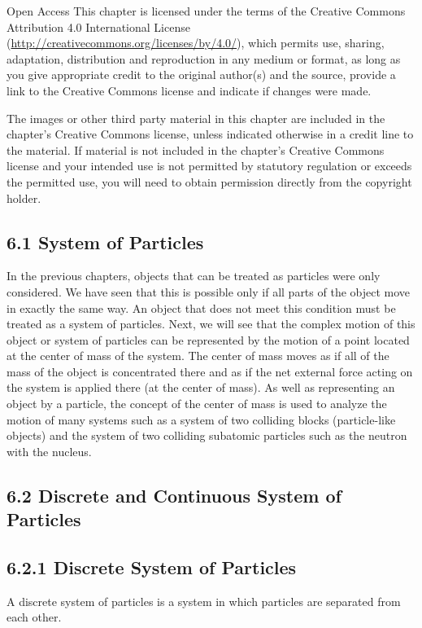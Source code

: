 \documentclass[10pt]{article}
\begin{document}
Open Access This chapter is licensed under the terms of the Creative Commons Attribution 4.0 International License (\href{http://creativecommons.org/licenses/by/4.0/}{http://creativecommons.org/licenses/by/4.0/}), which permits use, sharing, adaptation, distribution and reproduction in any medium or format, as long as you give appropriate credit to the original author(s) and the source, provide a link to the Creative Commons license and indicate if changes were made.

The images or other third party material in this chapter are included in the chapter's Creative Commons license, unless indicated otherwise in a credit line to the material. If material is not included in the chapter's Creative Commons license and your intended use is not permitted by statutory regulation or exceeds the permitted use, you will need to obtain permission directly from the copyright holder.

\subsection*{6.1 System of Particles}
In the previous chapters, objects that can be treated as particles were only considered. We have seen that this is possible only if all parts of the object move in exactly the same way. An object that does not meet this condition must be treated as a system of particles. Next, we will see that the complex motion of this object or system of particles can be represented by the motion of a point located at the center of mass of the system. The center of mass moves as if all of the mass of the object is concentrated there and as if the net external force acting on the system is applied there (at the center of mass). As well as representing an object by a particle, the concept of the center of mass is used to analyze the motion of many systems such as a system of two colliding blocks (particle-like objects) and the system of two colliding subatomic particles such as the neutron with the nucleus.

\subsection*{6.2 Discrete and Continuous System of Particles}
\subsection*{6.2.1 Discrete System of Particles}
A discrete system of particles is a system in which particles are separated from each other.
\end{document}
